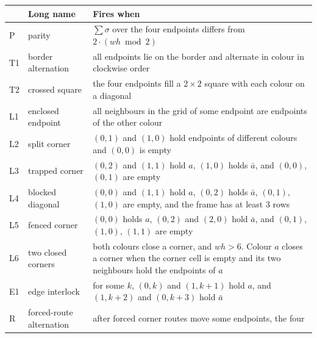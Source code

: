 \documentclass[11pt]{article}
\newcommand{\ent}[1]{\textsf{#1}}
\begin{document}
\begin{table}[htbp]
\centering\small
\begin{tabular}{@{}l>{\raggedright\arraybackslash}p{}>{\raggedright\arraybackslash}p{}@{}}
\toprule
& Long name & Fires when \\
\midrule
\ent{P} & parity & $\sum\sigma$ over the four endpoints differs from $2\cdot(wh \bmod 2)$ \\
\ent{T1} & border alternation & all endpoints lie on the border and alternate in colour in
  clockwise order \\
\ent{T2} & crossed square & the four endpoints fill a $2\times 2$ square with each colour on a
  diagonal \\
\ent{L1} & enclosed endpoint & all neighbours in the grid of some endpoint are endpoints of the
  other colour \\
\ent{L2} & split corner & $(0,1)$ and $(1,0)$ hold endpoints of different colours and $(0,0)$ is
  empty \\
\ent{L3} & trapped corner & $(0,2)$ and $(1,1)$ hold $a$, $(1,0)$ holds $\bar a$, and $(0,0)$,
  $(0,1)$ are empty \\
\ent{L4} & blocked diagonal & $(0,0)$ and $(1,1)$ hold $a$, $(0,2)$ holds $\bar a$, $(0,1)$,
  $(1,0)$ are empty, and the frame has at least $3$ rows \\
\ent{L5} & fenced corner & $(0,0)$ holds $a$, $(0,2)$ and $(2,0)$ hold $\bar a$, and $(0,1)$,
  $(1,0)$, $(1,1)$ are empty \\
\ent{L6} & two closed corners & both colours close a corner, and $wh>6$. Colour $a$ closes a
  corner when the corner cell is empty and its two neighbours hold the endpoints of $a$ \\
\ent{E1} & edge interlock & for some $k$, $(0,k)$ and $(1,k+1)$ hold $a$, and $(1,k+2)$ and
  $(0,k+3)$ hold $\bar a$ \\
\ent{R} & forced-route alternation & after forced corner routes move some endpoints, the four

\end{tabular}
\end{table}
\end{document}
